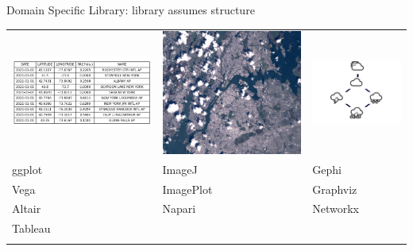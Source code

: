 \documentclass[xcolor={dvipsnames}]{beamer}
\begin{document}
\begin{frame}{Domain Specific Library: library assumes structure \cite{HeerSoftware2006}}
    \begin{table}
        \begin{tabular}{>{\onslide<1->}l>{\onslide<2->}l>{\onslide<3->}l}
            \includegraphics[width=.24\textwidth]{figures/intro/table.png} & \includegraphics[width=.3\textwidth]{figures/intro/landsat.png} & \includegraphics[width=.33\textwidth]{figures/math/graph.png} \\
            ggplot\cite{wickhamGgplot2ElegantGraphics2016}  & ImageJ\cite{schneiderNIHImageImageJ2012}& Gephi\cite{bastianGephiOpenSource2009}\\
            Vega\cite{satyanarayanDeclarativeInteractionDesign2014} & ImagePlot\cite{studiesCulturevisImageplot2021} & Graphviz\cite{ellsonGraphvizOpenSource2002}\\
            Altair\cite{vanderplasAltairInteractiveStatistical2018}& Napari\cite{nicholas_sofroniew_2021_4533308} & Networkx\cite{HagbergExploringNetwork2008}\\
             Tableau \cite{StoltePolaris2002}& &\\
            \cite{hanrahanVizQL2006,MackinlayShowme2007}&&\\
        \end{tabular}
    \end{table}
\end{frame}
\end{document}
